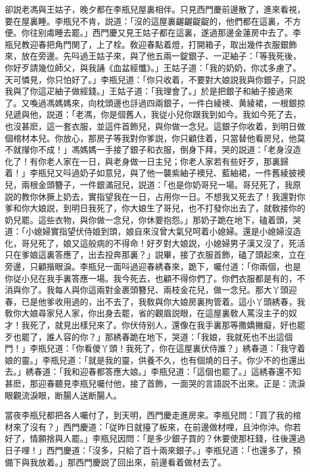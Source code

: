卻説老馮與王姑子，晚夕都在李瓶兒屋裏相伴。只見西門慶前邊散了，進來看視，要在屋裏睡。李瓶兒不肯，説道：「沒的這屋裏齷齷齪齪的，他們都在這裏，不方便。你往别䖏睡去罷。」西門慶又見王姑子都在這裏，遂過那邊金蓮房中去了。李瓶兒教迎春把角門関了，上了栓。敎迎春點着燈，打開箱子，取出幾件衣服銀飾來，放在旁邊。先呌過王姑子來，與了他五兩一錠銀子、一疋紬子：「等我死後，你好歹請幾位師父，與我誦《血盆經懺》。」王姑子道：「我的奶奶，你忒多慮了。天可憐見，你只怕好了。」李瓶兒道：「你只收着，不要對大娘説我與你銀子，只説我與了你這疋紬子做經錢。」王姑子道：「我理會了。」於是把銀子和紬子接過來了。又喚過馮媽媽來，向枕頭邊也㧱過四兩銀子，一件白綾襖、黄綾裙，一根銀掠兒遞與他，説道：「老馮，你是個舊人，我従小兒你跟我到如今。我如今死了去，也沒甚麽，這一套衣服，並這件首飾兒，與你做一念兒。這銀子你收着，到明日做個棺材本兒。你放心，那房子等我對你爹説，你只顧住着，只當替他看房兒，他莫不就攆你不成！」馮媽媽一手接了銀子和衣服，倒身下拜，哭的説道：「老身沒造化了！有你老人家在一日，與老身做一日主兒；你老人家若有些好歹，那裏歸着！」李瓶兒又呌過奶子如意兒，與了他一襲紫紬子襖兒、藍紬裙，一件舊綾披襖兒，兩根金頭簪子，一件銀滿冠兒，説道：「也是你奶哥兒一場。哥兒死了，我原説的教你休撅上奶去，實指望我在一日，占用你一日。不想我又死去了！我還對你爹和你大娘説，到明日我死了，你大娘生了哥兒，也不打發你出去了，就敎接你的奶兒罷。這些衣物，與你做一念兒，你休要抱怨。」那奶子跪在地下，磕着頭，哭道：「小媳婦實指望伏侍娘到頭，娘自來沒曾大氣兒呵着小媳婦。還是小媳婦沒造化，哥兒死了，娘又這般病的不得命！好歹對大娘説，小媳婦男子漢又沒了，死活只在爹娘這裏答應了，出去投奔那裏？」説畢，接了衣服首飾，磕了頭起來，立在旁邊，只顧揩眼淚。李瓶兒一面呌過迎春綉春來，跪下，囑付道：「你兩個，也是你従小兒在我手裏答應一場。我今死去，也顧不得你們了。你們衣服都是有的，不消與你了。我每人與你這兩對金裹頭簪兒、兩枝金花兒，做一念兒。那大丫頭迎春，已是他爹收用過的，出不去了，我敎與你大娘房裏拘管着。這小丫頭綉春，我敎你大娘尋家兒人家，你出身去罷，省的觀眉説眼，在這屋裏敎人罵沒主子的奴才！我死了，就見出樣兒來了。你伏侍别人，還像在我手裏那等撒嬌撇癡，好也罷歹也罷了，誰人容的你？」那綉春跪在地下，哭道：「我娘，我就死也不出這個門！」李瓶兒道：「你看儍丫頭！我死了，你在這屋裏伏侍誰？」綉春道：「我守着娘的靈。」李瓶兒道：「就是我的靈，供養不久，也有個燒的日子。你少不的也還出去。」綉春道：「我和迎春都答應大娘。」李瓶兒道：「這個也罷了。」這綉春還不知甚麽，那迎春聽見李瓶兒囑付他，接了首飾，一面哭的言語説不出來。正是：流淚眼觀流淚眼，断腸人送断腸人。

當夜李瓶兒都把各人囑付了，到天明，西門慶走進房來。李瓶兒問：「買了我的棺材來了沒有？」西門慶道：「従昨日就擡了板來，在前邊做材哩，且沖你沖。你若好了，情願捨與人罷。」李瓶兒因問：「是多少銀子買的？休要使那枉錢，往後還過日子哩！」西門慶道：「沒多，只給了百十兩來銀子。」李瓶兒道：「也還多了，預備下與我放着。」那西門慶説了回出來，前邊看着做材去了。

